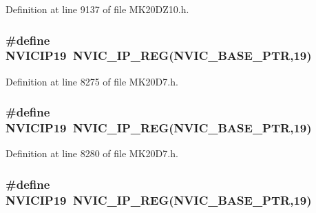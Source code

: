 Definition at line 9137 of file M\+K20\+D\+Z10.\+h.

\subsubsection[{\texorpdfstring{N\+V\+I\+C\+I\+P19}{NVICIP19}}]{\setlength{\rightskip}{0pt plus 5cm}\#define N\+V\+I\+C\+I\+P19~{\bf N\+V\+I\+C\+\_\+\+I\+P\+\_\+\+R\+EG}({\bf N\+V\+I\+C\+\_\+\+B\+A\+S\+E\+\_\+\+P\+TR},19)}\hypertarget{group___n_v_i_c___register___accessor___macros_gab4e860d16d2fc9b82267d19bcf14746d}{}\label{group___n_v_i_c___register___accessor___macros_gab4e860d16d2fc9b82267d19bcf14746d}


Definition at line 8275 of file M\+K20\+D7.\+h.

\subsubsection[{\texorpdfstring{N\+V\+I\+C\+I\+P19}{NVICIP19}}]{\setlength{\rightskip}{0pt plus 5cm}\#define N\+V\+I\+C\+I\+P19~{\bf N\+V\+I\+C\+\_\+\+I\+P\+\_\+\+R\+EG}({\bf N\+V\+I\+C\+\_\+\+B\+A\+S\+E\+\_\+\+P\+TR},19)}\hypertarget{group___n_v_i_c___register___accessor___macros_gab4e860d16d2fc9b82267d19bcf14746d}{}\label{group___n_v_i_c___register___accessor___macros_gab4e860d16d2fc9b82267d19bcf14746d}


Definition at line 8280 of file M\+K20\+D7.\+h.

\subsubsection[{\texorpdfstring{N\+V\+I\+C\+I\+P19}{NVICIP19}}]{\setlength{\rightskip}{0pt plus 5cm}\#define N\+V\+I\+C\+I\+P19~{\bf N\+V\+I\+C\+\_\+\+I\+P\+\_\+\+R\+EG}({\bf N\+V\+I\+C\+\_\+\+B\+A\+S\+E\+\_\+\+P\+TR},19)}\hypertarget{group___n_v_i_c___register___accessor___macros_gab4e860d16d2fc9b82267d19bcf14746d}{}\label{group___n_v_i_c___register___accessor___macros_gab4e860d16d2fc9b82267d19bcf14746d}


